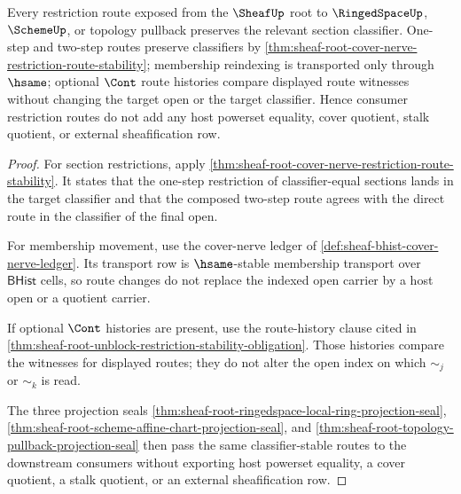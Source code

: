 \begin{theorem}
\label{thm:sheaf-root-downstream-consumer-classifier-stability}
Every restriction route exposed from the $\SheafUp$ root to $\RingedSpaceUp$, $\SchemeUp$, or topology pullback preserves the relevant section classifier. One-step and two-step routes preserve classifiers by \autoref{thm:sheaf-root-cover-nerve-restriction-route-stability}; membership reindexing is transported only through $\hsame$; optional $\Cont$ route histories compare displayed route witnesses without changing the target open or the target classifier. Hence consumer restriction routes do not add any host powerset equality, cover quotient, stalk quotient, or external sheafification row.
\end{theorem}
\begin{proof}
For section restrictions, apply \autoref{thm:sheaf-root-cover-nerve-restriction-route-stability}. It states that the one-step restriction of classifier-equal sections lands in the target classifier and that the composed two-step route agrees with the direct route in the classifier of the final open.

For membership movement, use the cover-nerve ledger of \autoref{def:sheaf-bhist-cover-nerve-ledger}. Its transport row is $\hsame$-stable membership transport over $\mathsf{BHist}$ cells, so route changes do not replace the indexed open carrier by a host open or a quotient carrier.

If optional $\Cont$ histories are present, use the route-history clause cited in \autoref{thm:sheaf-root-unblock-restriction-stability-obligation}. Those histories compare the witnesses for displayed routes; they do not alter the open index on which $\sim_j$ or $\sim_k$ is read.

The three projection seals \autoref{thm:sheaf-root-ringedspace-local-ring-projection-seal}, \autoref{thm:sheaf-root-scheme-affine-chart-projection-seal}, and \autoref{thm:sheaf-root-topology-pullback-projection-seal} then pass the same classifier-stable routes to the downstream consumers without exporting host powerset equality, a cover quotient, a stalk quotient, or an external sheafification row.
\end{proof}

